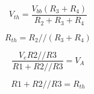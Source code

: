 
\begin{equation}
	V_{th} = \frac{V_{bb}(R_3+R_4)}{R_2+R_3+R_4}
	\label{Voltaje Thevenin DC}
\end{equation}

\begin{equation}
	R_{th} = R_2//(R_3+R_4)
	\label{Resistencia Thevenin DC}
\end{equation}


\begin{equation}
	\frac{V_eR2//R3}{R1+R2//R3} = V_A
	\label{Voltaje Thevenin AC}
\end{equation}



\begin{equation}
	R1+R2//R3 = R_{th}
	\label{Resistencia Thevenin AC}
\end{equation}
